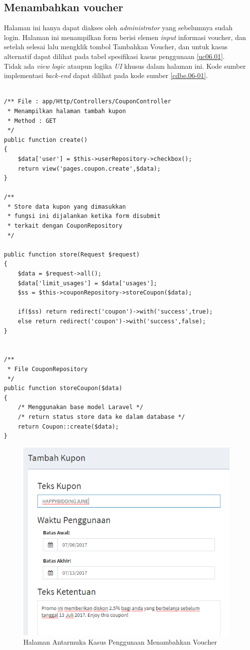 \subsection{Menambahkan voucher}
Halaman ini hanya dapat diakses oleh \textit{administrator} yang sebelumnya sudah login. Halaman ini menampilkan form berisi elemen \textit{input} informasi voucher, dan setelah selesai lalu mengklik tombol Tambahkan Voucher, dan untuk kasus alternatif dapat dilihat pada tabel spesifikasi kasus penggunaan \ref{uc06.01}.\\
\indent Tidak ada \textit{view logic} ataupun logika \textit{UI} khusus dalam halaman ini. Kode sumber implementasi \textit{back-end} dapat dilihat pada kode sumber \ref{cdbe.06-01}.

\begin{lstlisting}[label=cdbe.06-01,style=php,caption=Kode Sumber Antarmuka Registrasi]

/** File : app/Http/Controllers/CouponController
 * Menampilkan halaman tambah kupon
 * Method : GET
 */
public function create()
{
    $data['user'] = $this->userRepository->checkbox();
    return view('pages.coupon.create',$data);
}

/**
 * Store data kupon yang dimasukkan
 * fungsi ini dijalankan ketika form disubmit
 * terkait dengan CouponRepository
 */

public function store(Request $request)
{
    $data = $request->all();
    $data['limit_usages'] = $data['usages'];
    $ss = $this->couponRepository->storeCoupon($data);

    if($ss) return redirect('coupon')->with('success',true);
    else return redirect('coupon')->with('success',false);
}


/**
 * File CouponRepository
 */
public function storeCoupon($data)
{
	/* Menggunakan base model Laravel */
	/* return status store data ke dalam database */
    return Coupon::create($data);
}  
\end{lstlisting}
	  
      \begin{figure}[H]
        \centering
        \includegraphics[width=\textwidth]{images/bab4/ui/06-01.png}
        \caption{Halaman Antarmuka Kasus Penggunaan Menambahkan Voucher}
        \label{ui.01-01}
      \end{figure}
      
